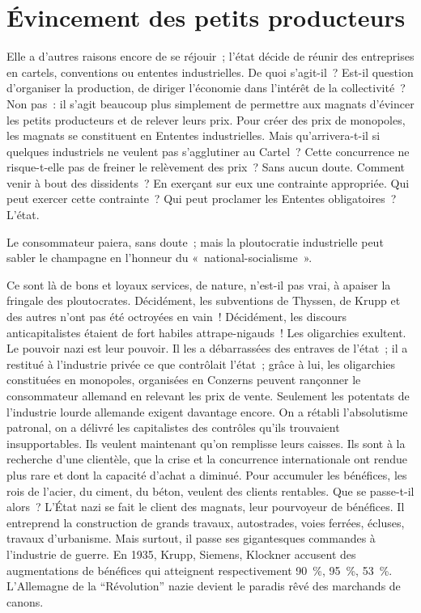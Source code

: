 \documentclass[french,twoside]{book} %
\begin{document}
\section[{Évincement des petits producteurs}]{Évincement des petits producteurs}
\noindent Elle a d’autres raisons encore de se réjouir ; l’état décide de réunir des entreprises en cartels, conventions ou ententes industrielles. De quoi s’agit-il ? Est-il question d’organiser la production, de diriger l’économie dans l’intérêt de la collectivité ? Non pas : il s’agit beaucoup plus simplement de permettre aux magnats d’évincer les petits producteurs et de relever leurs prix. Pour créer des prix de monopoles, les magnats se constituent en Ententes industrielles. Mais qu’arrivera-t-il si quelques industriels ne veulent pas s’agglutiner au Cartel ? Cette concurrence ne risque-t-elle pas de freiner le relèvement des prix ? Sans aucun doute. Comment venir à bout des dissidents ? En exerçant sur eux une contrainte appropriée. Qui peut exercer cette contrainte ? Qui peut proclamer les Ententes obligatoires ? L’état.\par
Le consommateur paiera, sans doute ; mais la ploutocratie industrielle peut sabler le champagne en l’honneur du « national-socialisme ».\par
Ce sont là de bons et loyaux services, de nature, n’est-il pas vrai, à apaiser la fringale des ploutocrates. Décidément, les subventions de Thyssen, de Krupp et des autres n’ont pas été octroyées en vain ! Décidément, les discours anticapitalistes étaient de fort habiles attrape-nigauds ! Les oligarchies exultent. Le pouvoir nazi est leur pouvoir. Il les a débarrassées des entraves de l’état ; il a restitué à l’industrie privée ce que contrôlait l’état ; grâce à lui, les oligarchies constituées en monopoles, organisées en Conzerns peuvent rançonner le consommateur allemand en relevant les prix de vente. Seulement les potentats de l’industrie lourde allemande exigent davantage encore. On a rétabli l’absolutisme patronal, on a délivré les capitalistes des contrôles qu’ils trouvaient insupportables. Ils veulent maintenant qu’on remplisse leurs caisses. Ils sont à la recherche d’une clientèle, que la crise et la concurrence internationale ont rendue plus rare et dont la capacité d’achat a diminué. Pour accumuler les bénéfices, les rois de l’acier, du ciment, du béton, veulent des clients rentables. Que se passe-t-il alors ? L’État nazi se fait le client des magnats, leur pourvoyeur de bénéfices. Il entreprend la construction de grands travaux, autostrades, voies ferrées, écluses, travaux d’urbanisme. Mais surtout, il passe ses gigantesques commandes à l’industrie de guerre. En 1935, Krupp, Siemens, Klockner accusent des augmentations de bénéfices qui atteignent respectivement 90 \%, 95 \%, 53 \%. L’Allemagne de la “Révolution” nazie devient le paradis rêvé des marchands de canons.
\end{document}
